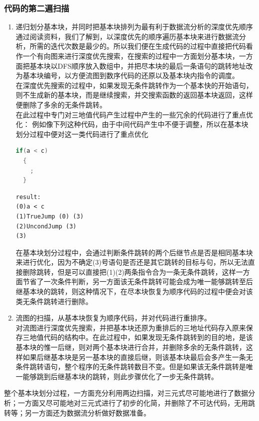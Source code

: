 \documentclass[12pt,a4paper,Flow]{report}
\begin{document}
\subsubsection{代码的第二遍扫描}
\begin{enumerate}
\item 递归划分基本块，并同时把基本块排列为最有利于数据流分析的深度优先顺序\\
\indent 通过阅读资料，我们了解到，以深度优先的顺序遍历基本块来进行数据流分析，所需的迭代次数是最少的。所以我们便在生成代码的过程中直接把代码看作一个有向图来进行深度优先搜索，在搜索的过程中一方面划分基本块，一方面把基本块以DFS顺序放入数组中，并把尽本块的最后一条语句的跳转地址改为基本块编号，以方便流图到数序代码的还原以及基本块内指令的调度。\\
\indent	在深度优先搜索的过程中，如果发现无条件跳转作为一个基本快的开始语句，则不生成新的基本块，而是继续搜索，并交搜索函数的返回基本块返回，这样便删除了多余的无条件跳转。\\
\indent	在此过程中专门对三地值代码产生过程中产生的一些冗余的代码进行了重点优化：
例如像下列这种代码，由于中间代码产生中不便于调整，所以在基本块划分过程中便对这一类代码进行了重点优化
\begin{lstlisting}[language=c]
  if(a < c)
  {
	;
  }
\end{lstlisting}
\begin{verbatim}
result:
(0)a < c
(1)TrueJump (0) (3)
(2)UncondJump (3)
(3)
\end{verbatim}
在基本块划分过程中，会通过判断条件跳转的两个后继节点是否是相同基本块来进行优化，因为不确定(3)号语句是否还是其它跳转的目标与句，所以无法直接删除跳转，但是可以直接把(1)(2)两条指令合为一条无条件跳转，这样一方面节省了一次条件判断，另一方面该无条件跳转可能会成为唯一能够跳转至后继基本块的跳转，则这种情况下，在尽本块恢复为顺序代码的过程中便会对该类无条件跳转进行删除。
\item 流图的扫描，从基本块恢复为顺序代码，并对代码进行重排序。\\\indent
  对流图进行深度优先搜索，并把基本块还原为重排后的三地址代码存入原来保存三地值代码的结构中。在此过程中，如果发现无条件跳转到的目的地，是该基本块的惟一后继，则对两个基本块进行合并，并删除多余的无条件跳转，这样如果后继基本块是另一基本块的直接后继，则该基本块最后会多产生一条无条件跳转语句，整个程序的无条件跳转数目不变。但是如果该无条件跳转是唯一能够跳到后继基本块的跳转，则此步骤优化了一步无条件跳转。
\end{enumerate}
整个基本块划分过程，一方面充分利用两边扫描，对三元式尽可能地进行了数据分析；一方面又尽可能地对三元式进行了初步的化简，并删除了不可达代码，无用跳转等；另一方面还为数据流分析做好数据准备。
\end{document}
